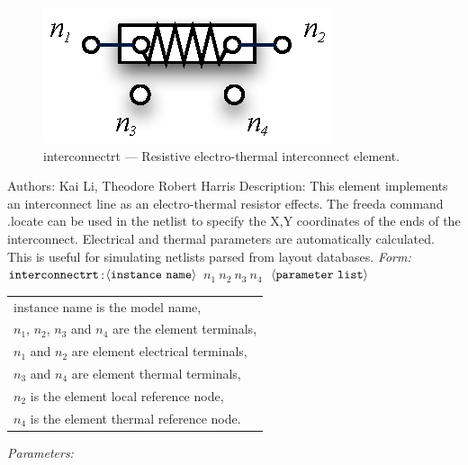 \documentclass{article}
\begin{document}
\myThickLine
\normalsize
\newline
\begin{figure}[h]
\centerline{\includegraphics[scale=1.5]{interconnectrt.eps}} \caption{interconnectrt --- Resistive
electro-thermal interconnect element.}
\end{figure}
\newline
Authors: Kai Li, Theodore Robert Harris
\newline
\myThickLine
\newline
Description:\newline
This element implements an interconnect line as an electro-thermal resistor effects. The freeda command .locate can be used in the netlist to specify the X,Y coordinates of the ends of the interconnect. Electrical and thermal parameters are automatically calculated. This is useful for simulating netlists parsed from layout databases.
\newline
\myThickLine
\newline
\textit{Form:}
$\tt interconnectrt$:$\langle \tt{instance\ name}\rangle$ $n_1\ n_2\ n_3\
n_4\ $ $\langle \tt{parameter\ list}\rangle$
\newline
\bigskip
\begin{tabular}{l}
instance name is the model name,\\
$n_1$, $n_2$, $n_3$ and $n_4$ are the element terminals, \\
$n_1$ and $n_2$ are element electrical terminals, \\
$n_3$ and $n_4$ are element thermal terminals, \\
$n_2$ is the element local reference node,\\
$n_4$ is the element thermal reference node. \\
\end{tabular}
\newline
\myThickLine
\textit{Parameters:}
\end{document}
